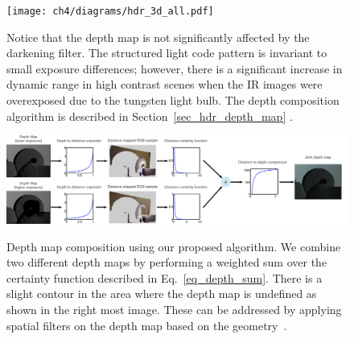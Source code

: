 \begin{figure}
\centering
\texttt{[image: ch4/diagrams/hdr\_3d\_all.pdf]} 
\caption{Notice that the depth map is not significantly affected by the darkening filter. The structured light code pattern is invariant to small exposure differences; however, there is a significant increase in dynamic range in high contrast scenes when the IR images were overexposed due to the tungsten light bulb. The depth composition algorithm is described in Section~\ref{sec_hdr_depth_map} \cite{lo2013three}.}

\label{fig_all_camera}
\end{figure}
\begin{figure}
\centering
\includegraphics[width=7in]{ch4/diagrams/jason_hdr.pdf} 
\label{fig_jason_dep_hdr}
\caption{Depth map composition using our proposed algorithm. We combine two different depth maps by performing a weighted sum over the certainty function described in Eq.~\ref{eq_depth_sum}. There is a slight contour in the area where the depth map is undefined as shown in the right most image. These can be addressed by applying spatial filters on the depth map based on the geometry~\cite{lo2013three}.}
\end{figure}
